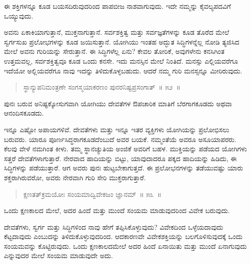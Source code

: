 \vspace{-0.3cm}

ಈ ಶಕ್ತಿಗಳನ್ನೂ ಕೂಡ ಬಯಸದಿರುವುದರಿಂದ ಪಾಪಬೀಜ ನಾಶವಾಗುವುದು. ಇದೇ ನಮ್ಮನ್ನು ಕೈವಲ್ಯಪದವಿಗೆ ಒಯ್ಯುವುದು. 

ಅವನು ಏಕಾಕಿಯಾಗುತ್ತಾನೆ, ಮುಕ್ತನಾಗುತ್ತಾನೆ. ಸರ್ವಶಕ್ತಿತ್ವ ಮತ್ತು ಸರ್ವಜ್ಞತೆಗಳನ್ನು ಕೂಡ ತೊರೆದ ಮೇಲೆ ಸ್ವರ್ಗಸುಖ ಪ್ರಲೋಭಗಳನ್ನು ಕೂಡ ಜಯಿಸುತ್ತಾನೆ. ಯೋಗಿಯು ಇಂತಹ ಅದ್ಭುತ ಸಿದ್ಧಿಗಳನ್ನೆಲ್ಲ ನೋಡಿ ತ್ಯಜಿಸಿದ ಮೇಲೆ ಅವನು ಗುರಿಯನ್ನು ಸೇರುತ್ತಾನೆ. ಈ ಸಿದ್ಧಿಗಳೆಲ್ಲ ಏನು? ಕೇವಲ ತೋರಿಕೆ, ಅವುಗಳೇನು ಕನಸಿಗಿಂತ ಉತ್ತಮವಲ್ಲ, ಸರ್ವಶಕ್ತಿತ್ವವೂ ಕೂಡ ಒಂದು ಕನಸೇ. ಇದು ಮನಸ್ಸಿನ ಮೇಲೆ ನಿಂತಿದೆ. ಮನಸ್ಸು ಎಲ್ಲಿಯವರೆಗೂ ಇದೆಯೋ ಅಲ್ಲಿಯವರೆಗೂ ನಾವು ಇದನ್ನು ತಿಳಿದುಕೊಳ್ಳಬಹುದು. ಆದರೆ ನಮ್ಮ ಗುರಿ ಮನಸ್ಸನ್ನೂ ಮೀರಿರುವುದು. 

\vspace{-0.3cm}

\begin{verse}
ಸ್ಥಾನ್ಯುಪನಿಮಂತ್ರಣೇ ಸಂಗಸ್ಮಯಾಕರಣಂ ಪುನರನಿಷ್ಟಪ್ರಸಂಗಾತ್​~॥ ೫೨~॥
\end{verse}

\vspace{-0.3cm}

ಪುನಃ ಬರುವ ಅನಿಷ್ಟಕ್ಕೋಸುಗವಾಗಿ ಯೋಗಿಯು ದೇವತೆಗಳ ಔಪಚಾರಿಕ ಮಾತಿಗೆ ಬೆರಗಾಗಕೂಡದು ಅಥವಾ ಆನಂದಿಸಕೂಡದು. 

ಇನ್ನೂ ಎಷ್ಟೋ ಅಪಾಯಗಳಿವೆ. ದೇವತೆಗಳು ಮತ್ತು ಇನ್ನೂ ಇತರ ವ್ಯಕ್ತಿಗಳು ಯೋಗಿಯನ್ನು ಪ್ರಲೋಭಿಸಲು ಬರುವರು. ಯಾರೂ ಪೂರ್ಣಸಿದ್ಧರಾಗಕೂಡದೆಂಬುದೆ ಅವರ ಬಯಕೆ. ನಮ್ಮಂತೆಯೆ ಅವರೂ ಅಸೂಯಾಪರರು. ಕೆಲವು ವೇಳೆ ನಮಗಿಂತ ಕೀಳು. ತಮ್ಮ ಸ್ಥಾನಚ್ಯುತಿಯ ಅಂಜಿಕೆ ಅವರಿಗೆ ಬಹಳ. ಮುಕ್ತಿಯನ್ನು ಪಡೆಯದ ಯೋಗಿಗಳು ಸತ್ತರೆ ದೇವತೆಗಳಾಗುತ್ತಾರೆ. ನೇರವಾದ ಹಾದಿಯನ್ನು ಬಿಟ್ಟು, ಯಾವುದಾದರೂ ಪಕ್ಕದ ಹಾದಿಯನ್ನು ಹಿಡಿದು, ಈ ಸಿದ್ಧಿಗಳನ್ನು ಪಡೆಯುತ್ತಾರೆ. ಆಗ ಅವರು ಪುನಃ ಹುಟ್ಟಬೇಕಾಗುತ್ತದೆ. ಈ ಪ್ರಲೋಭನಗಳನ್ನು ತಡೆಯುವಷ್ಟು ಯಾರು ಶಕ್ತರಾಗಿರುವರೋ, ಅವರು ನೇರವಾಗಿ ಗುರಿ ಸೇರಿ ಮುಕ್ತರಾಗುತ್ತಾರೆ. 

\vspace{-0.3cm}

\begin{verse}
ಕ್ಷಣತತ್​ಕ್ರಮಯೋಃ ಸಂಯಮಾದ್ವಿವೇಕಜಂ ಜ್ಞಾನಮ್​~॥ ೫೩~॥
\end{verse}

\vspace{-0.3cm}

ಒಂದು ಕ್ಷಣಕಾಲದ ಮೇಲೆ, ಅದರ ಹಿಂದೆ ಮತ್ತು ಮುಂದೆ ಸಂಯಮ ಮಾಡುವುದರಿಂದ ವಿವೇಕ ಬರುವುದು. 

ದೇವತೆಗಳು, ಸ್ವರ್ಗ ಮತ್ತು ಸಿದ್ಧಿಗಳಿಂದ ನಾವು ಹೇಗೆ ತಪ್ಪಿಸಿಕೊಳ್ಳುವುದು? ವಿವೇಕದಿಂದ ಒಳ್ಳೆಯದಾವುದು ಕೆಟ್ಟದಾವುದು ಎಂಬುದನ್ನು ತಿಳಿದುಕೊಳ್ಳುವುದರಿಂದ. ಆದಕಾರಣವೇ ವಿವೇಕಶಕ್ತಿಯನ್ನು ಬಲಗೊಳಿಸುವುದಕ್ಕೆ ಒಂದು ಸಂಯಮವನ್ನು ಕೊಟ್ಟಿರುವುದು. ಒಂದು ಕ್ಷಣಕಾಲದಮೇಲೆ ಅದರ ಹಿಂದೆ ಏನಾಯಿತು ಮತ್ತು ಮುಂದೆ ಏನಾಗುವುದು ಎನ್ನುವುದರ ಮೇಲೆ ಸಂಯಮ ಮಾಡುವುದೇ ಅದು. 

\vspace{-0.3cm}

